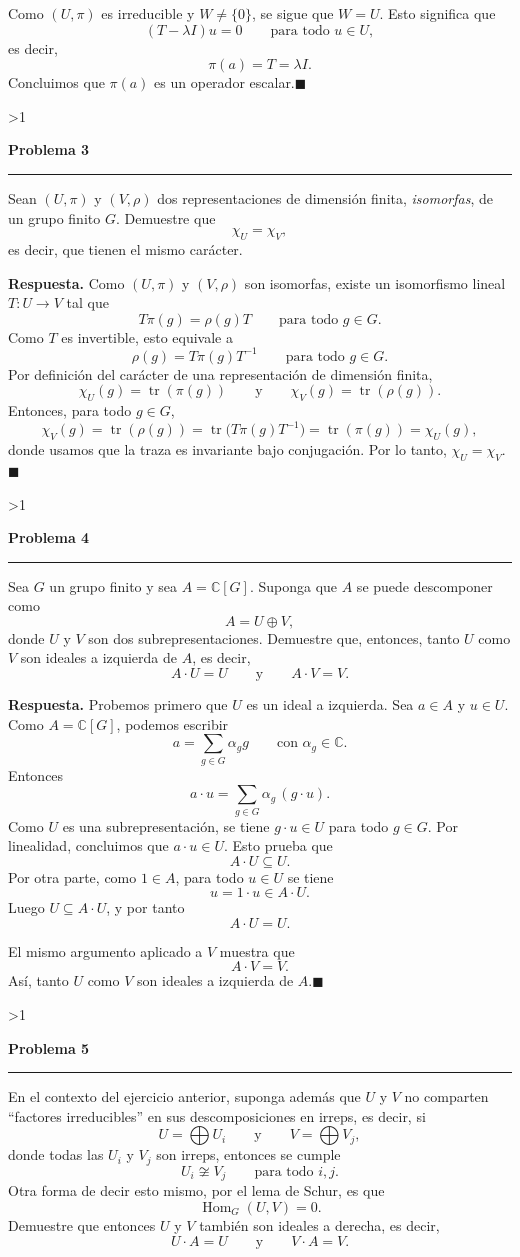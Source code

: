 \documentclass[10pt,a4paper]{article}
\newcommand{\CC}{\mathbb{C}}
\newcommand{\inlinehead}[2][repblue]{%
  \par\smallskip
  {\color{#1}\bfseries #2.}\hspace{0.45em}%
}
\newcounter{probcnt}
\newcommand{\problem}[2]{%
  \stepcounter{probcnt}%
  \ifnum\value{probcnt}>1\newpage\fi
  \par\vspace{0.25em}
  {\large\bfseries\color{repblue} Problema #1}\par
  {\color{repline}\rule{\linewidth}{0.55pt}}\par
  \begin{tcolorbox}[
    breakable,
    colback=white,
    colframe=repline,
    borderline west={1.6pt}{0pt}{repteal},
    left=0.7em,
    right=0.7em,
    top=0.35em,
    bottom=0.3em,
    before skip=0.35em,
    after skip=0.45em
  ]
    #2
  \end{tcolorbox}
}
\begin{document}
Como $(U,\pi)$ es irreducible y $W\neq\{0\}$, se sigue que $W=U$. Esto
significa que
\[
  (T-\lambda I)u=0
  \qquad\text{para todo } u\in U,
\]
es decir,
\[
  \pi(a)=T=\lambda I.
\]
Concluimos que $\pi(a)$ es un operador escalar.\hfill$\blacksquare$

\problem{3}{%
Sean $(U,\pi)$ y $(V,\rho)$ dos representaciones de dimensión finita,
\textit{isomorfas}, de un grupo finito $G$. Demuestre que
\[
  \chi_U = \chi_V,
\]
es decir, que tienen el mismo carácter.
}

\inlinehead{Respuesta} Como $(U,\pi)$ y $(V,\rho)$ son isomorfas, existe un
isomorfismo lineal $T\colon U\to V$ tal que
\[
  T\pi(g)=\rho(g)T
  \qquad\text{para todo } g\in G.
\]
Como $T$ es invertible, esto equivale a
\[
  \rho(g)=T\pi(g)T^{-1}
  \qquad\text{para todo } g\in G.
\]
Por definición del carácter de una representación de dimensión finita,
\[
  \chi_U(g)=\operatorname{tr}(\pi(g))
  \qquad\text{y}\qquad
  \chi_V(g)=\operatorname{tr}(\rho(g)).
\]
Entonces, para todo $g\in G$,
\[
  \chi_V(g)=\operatorname{tr}(\rho(g))
  =\operatorname{tr}\bigl(T\pi(g)T^{-1}\bigr)
  =\operatorname{tr}(\pi(g))
  =\chi_U(g),
\]
donde usamos que la traza es invariante bajo conjugación. Por lo tanto,
$\chi_U=\chi_V$.\hfill$\blacksquare$

\problem{4}{%
Sea $G$ un grupo finito y sea $A=\CC[G]$. Suponga que $A$ se puede descomponer
como
\[
  A = U \oplus V,
\]
donde $U$ y $V$ son dos subrepresentaciones. Demuestre que, entonces, tanto
$U$ como $V$ son ideales a izquierda de $A$, es decir,
\[
  A\cdot U = U
  \qquad\text{y}\qquad
  A\cdot V = V.
\]
}

\inlinehead{Respuesta} Probemos primero que $U$ es un ideal a izquierda. Sea
$a\in A$ y $u\in U$. Como $A=\CC[G]$, podemos escribir
\[
  a=\sum_{g\in G}\alpha_g g
  \qquad\text{con } \alpha_g\in\CC.
\]
Entonces
\[
  a\cdot u=\sum_{g\in G}\alpha_g\,(g\cdot u).
\]
Como $U$ es una subrepresentación, se tiene $g\cdot u\in U$ para todo
$g\in G$. Por linealidad, concluimos que $a\cdot u\in U$. Esto prueba que
\[
  A\cdot U\subseteq U.
\]
Por otra parte, como $1\in A$, para todo $u\in U$ se tiene
\[
  u=1\cdot u\in A\cdot U.
\]
Luego $U\subseteq A\cdot U$, y por tanto
\[
  A\cdot U=U.
\]

El mismo argumento aplicado a $V$ muestra que
\[
  A\cdot V=V.
\]
Así, tanto $U$ como $V$ son ideales a izquierda de $A$.\hfill$\blacksquare$

\problem{5}{%
En el contexto del ejercicio anterior, suponga además que $U$ y $V$ no
comparten ``factores irreducibles'' en sus descomposiciones en irreps, es
decir, si
\[
  U = \bigoplus U_i
  \qquad\text{y}\qquad
  V = \bigoplus V_j,
\]
donde todas las $U_i$ y $V_j$ son irreps, entonces se cumple
\[
  U_i \not\cong V_j \qquad \text{para todo } i,j.
\]
Otra forma de decir esto mismo, por el lema de Schur, es que
\[
  \operatorname{Hom}_G(U,V)=0.
\]
Demuestre que entonces $U$ y $V$ también son ideales a derecha, es decir,
\[
  U\cdot A = U
  \qquad\text{y}\qquad
  V\cdot A = V.
\]
}
\end{document}
